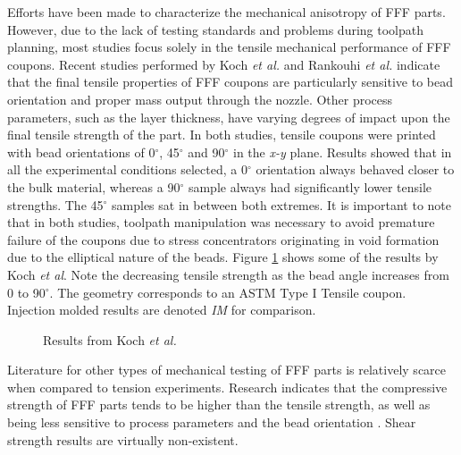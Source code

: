 \documentclass[main.tex]{subfiles}
\begin{document}
Efforts have been made to characterize the mechanical anisotropy of FFF parts. However, due to the lack of testing standards and problems during toolpath planning, most studies focus solely in the tensile mechanical performance of FFF coupons. Recent studies performed by Koch \emph{et al.} \cite{Koch2017} and Rankouhi \emph{et al.} \cite{Rankouhi2016} indicate that the final tensile properties of FFF coupons are particularly sensitive to bead orientation and proper mass output through the nozzle. Other process parameters, such as the layer thickness, have varying degrees of impact upon the final tensile strength of the part. In both studies, tensile coupons were printed with bead orientations of 0$^\circ$, 45$^\circ$ and 90$^\circ$ in the \emph{x-y} plane. Results showed that in all the experimental conditions selected, a 0$^\circ$ orientation always behaved closer to the bulk material, whereas a 90$^\circ$ sample always had significantly lower tensile strengths. The 45$^\circ$ samples sat in between both extremes. It is important to note that in both studies, toolpath manipulation was necessary to avoid premature failure of the coupons due to stress concentrators originating in void formation due to the elliptical nature of the beads. Figure \ref{fig:FFFmechProp} shows some of the results by Koch \emph{et al}. Note the decreasing tensile strength as the bead angle increases from 0 to 90$^\circ$. The geometry corresponds to an ASTM Type I Tensile coupon. Injection molded results are denoted \emph{IM} for comparison.

\begin{figure}[h]
	\center
	\hfill
	\caption{Results from Koch \emph{et al.} \cite{Koch2017}} \label{fig:FFFmechProp}
\end{figure}
\pagebreak

Literature for other types of mechanical testing of FFF parts is relatively scarce when compared to tension experiments. Research indicates that the compressive strength of FFF parts tends to be higher than the tensile strength, as well as being less sensitive to process parameters and the bead orientation \cite{Ahn2002,Lee2007}. Shear strength results are virtually non-existent. 
\end{document}
